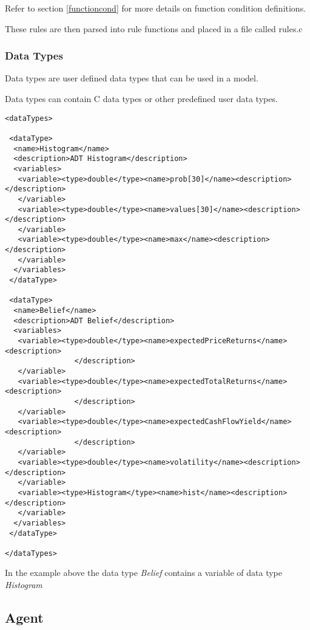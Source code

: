 Refer to section \ref{functioncond} for more details on function
condition definitions.

These rules are then parsed into rule functions and placed in a file
called rules.c

\subsubsection{Data Types}

Data types are user defined data types that can be used in a model.

Data types can contain C data types or other predefined user data types.

\begin{mylisting}
\begin{verbatim}
<dataTypes>

 <dataType>
  <name>Histogram</name>
  <description>ADT Histogram</description>
  <variables>
   <variable><type>double</type><name>prob[30]</name><description></description>
   </variable>
   <variable><type>double</type><name>values[30]</name><description></description>
   </variable>
   <variable><type>double</type><name>max</name><description></description>
   </variable>
  </variables>
 </dataType>

 <dataType>
  <name>Belief</name>
  <description>ADT Belief</description>
  <variables>
   <variable><type>double</type><name>expectedPriceReturns</name><description>
                </description>
   </variable>
   <variable><type>double</type><name>expectedTotalReturns</name><description>
                </description>
   </variable>
   <variable><type>double</type><name>expectedCashFlowYield</name><description>
                </description>
   </variable>
   <variable><type>double</type><name>volatility</name><description></description>
   </variable>
   <variable><type>Histogram</type><name>hist</name><description></description>
   </variable>
  </variables>
 </dataType>

</dataTypes>
\end{verbatim}
\end{mylisting}

In the example above the data type \emph{Belief} contains a variable
of data type \emph{Histogram}

\subsection{Agent}


